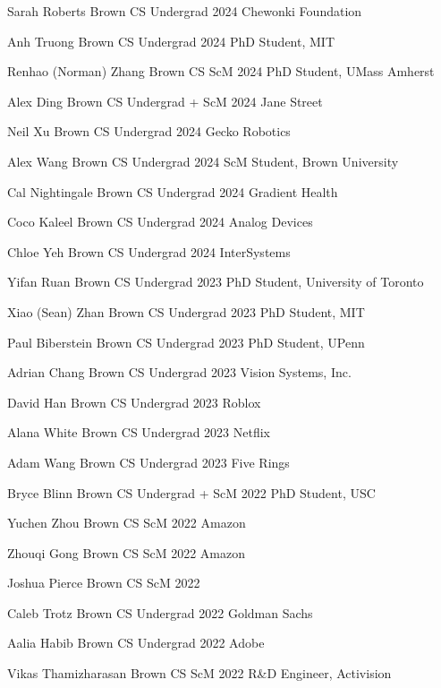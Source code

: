 \documentclass[line,margin]{res}
\begin{document}
\begin{resume}
\alumni
{Sarah Roberts}
{Brown CS Undergrad}
{2024}
{Chewonki Foundation}

\alumni
{Anh Truong}
{Brown CS Undergrad}
{2024}
{PhD Student, MIT}

\alumni
{Renhao (Norman) Zhang}
{Brown CS ScM}
{2024}
{PhD Student, UMass Amherst}


\alumni
{Alex Ding}
{Brown CS Undergrad + ScM}
{2024}
{Jane Street}

\alumni
{Neil Xu}
{Brown CS Undergrad}
{2024}
{Gecko Robotics}

\alumni
{Alex Wang}
{Brown CS Undergrad}
{2024}
{ScM Student, Brown University}

\alumni
{Cal Nightingale}
{Brown CS Undergrad}
{2024}
{Gradient Health}

\alumni
{Coco Kaleel}
{Brown CS Undergrad}
{2024}
{Analog Devices}

\alumni
{Chloe Yeh}
{Brown CS Undergrad}
{2024}
{InterSystems}

\alumni
{Yifan Ruan}
{Brown CS Undergrad}
{2023}
{PhD Student, University of Toronto}

\alumni
{Xiao (Sean) Zhan}
{Brown CS Undergrad}
{2023}
{PhD Student, MIT}

\alumni
{Paul Biberstein}
{Brown CS Undergrad}
{2023}
{PhD Student, UPenn}

\alumni
{Adrian Chang}
{Brown CS Undergrad}
{2023}
{Vision Systems, Inc.}

\alumni
{David Han}
{Brown CS Undergrad}
{2023}
{Roblox}

\alumni
{Alana White}
{Brown CS Undergrad}
{2023}
{Netflix}

\alumni
{Adam Wang}
{Brown CS Undergrad}
{2023}
{Five Rings}

\alumni
{Bryce Blinn}
{Brown CS Undergrad + ScM}
{2022}	
{PhD Student, USC}

\alumni
{Yuchen Zhou}
{Brown CS ScM}
{2022}
{Amazon}

\alumni
{Zhouqi Gong}
{Brown CS ScM}
{2022}
{Amazon}

\alumni
{Joshua Pierce}
{Brown CS ScM}
{2022}
{}

\alumni
{Caleb Trotz}
{Brown CS Undergrad}
{2022}
{Goldman Sachs}

\alumni
{Aalia Habib}
{Brown CS Undergrad}
{2022}
{Adobe}

\alumni
{Vikas Thamizharasan}
{Brown CS ScM}
{2022}
{R\&D Engineer, Activision}


\end{resume}
\end{document}
